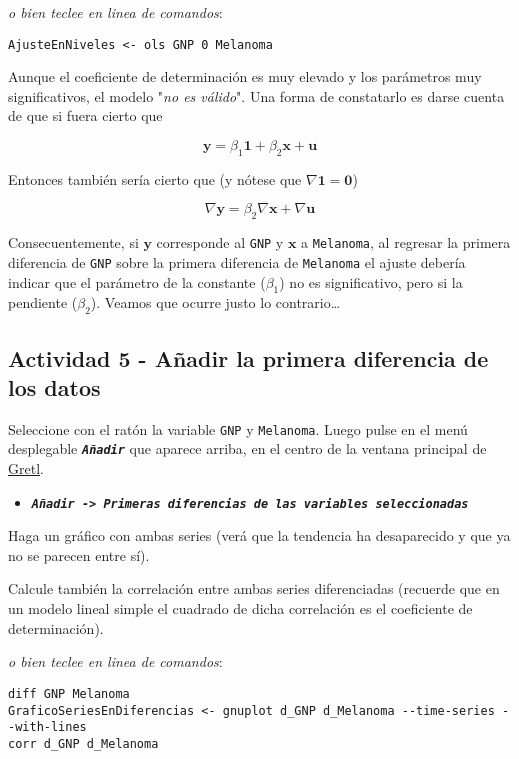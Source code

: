 \documentclass[11pt]{article}
\begin{document}
{\vspace{0pt} \footnotesize \color{gray!70!black}
\emph{o bien teclee en linea de comandos}:
\begin{verbatim}
AjusteEnNiveles <- ols GNP 0 Melanoma
\end{verbatim}
}

Aunque el coeficiente de determinación es muy elevado y los parámetros
muy significativos, el modelo "\emph{no es válido}". Una forma de
constatarlo es darse cuenta de que si fuera cierto que

$$\boldsymbol{y}=\beta_1 \boldsymbol{1} + \beta_2 \boldsymbol{x} +
\boldsymbol{u}$$

Entonces también sería cierto que (y nótese que
\(\nabla\boldsymbol{1}=\boldsymbol{0}\))

$$\nabla\boldsymbol{y}=\beta_2 \nabla\boldsymbol{x} +
\nabla\boldsymbol{u}$$

Consecuentemente, si \(\boldsymbol{y}\) corresponde al \texttt{GNP} y
\(\boldsymbol{x}\) a \texttt{Melanoma}, al regresar la primera diferencia de
\texttt{GNP} sobre la primera diferencia de \texttt{Melanoma} el ajuste debería
indicar que el parámetro de la constante (\(\beta_1\)) no es
significativo, pero si la pendiente (\(\beta_2\)). Veamos que ocurre justo lo contrario\ldots{}

\subsection{Actividad 5 - Añadir la primera diferencia de los datos}
\label{sec:org25461a3}

Seleccione con el ratón la variable \texttt{GNP} y \texttt{Melanoma}. Luego pulse en el menú desplegable \textbf{\emph{\texttt{Añadir}}} que aparece arriba, en el centro de la
ventana principal de \href{https://gretl.sourceforge.net/es.html}{Gretl}.
\begin{itemize}
\item \textbf{\emph{\texttt{Añadir -> Primeras diferencias de las variables seleccionadas}}}
\end{itemize}

Haga un gráfico con ambas series (verá que la tendencia ha desaparecido y que ya no se parecen entre sí).

Calcule también la correlación entre ambas series diferenciadas
(recuerde que en un modelo lineal simple el cuadrado de dicha
correlación es el coeficiente de determinación).

{\vspace{0pt} \footnotesize \color{gray!70!black}
\emph{o bien teclee en linea de comandos}: 
\begin{verbatim}
diff GNP Melanoma
GraficoSeriesEnDiferencias <- gnuplot d_GNP d_Melanoma --time-series --with-lines
corr d_GNP d_Melanoma
\end{verbatim}
}
\end{document}

